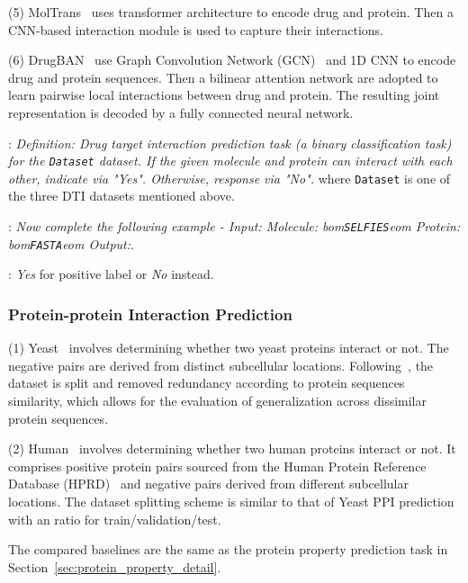 \documentclass[11pt]{article}
\newcommand{\bom}{bom}
\newcommand{\eom}{eom}
\newcommand{\bop}{bom}
\newcommand{\eop}{eom}
\newcommand{\dataset}{\texttt{Dataset}}
\newcommand{\selfies}{\texttt{SELFIES}}
\newcommand{\fasta}{\texttt{FASTA}}
\begin{document}
\noindent(5) MolTrans~\citep{Huang2021MolTransMI} uses transformer architecture to encode drug and protein. Then a CNN-based interaction module is used to capture their interactions.

\noindent(6) DrugBAN~\citep{bai2023interpretable} use Graph Convolution Network (GCN)~\citep{DBLP:conf/iclr/KipfW17} and 1D CNN to encode drug and protein sequences. Then a bilinear attention network are adopted to learn pairwise local interactions between drug and protein. The resulting joint representation is decoded by a fully connected neural network.


:
\textit{Definition: Drug target interaction prediction task (a binary classification task) for the \dataset{} dataset. If the given molecule and protein can interact with each other, indicate via "Yes". Otherwise, response via "No".} where \dataset{} is one of the three DTI datasets mentioned above.

:
\textit{Now complete the following example - Input: Molecule: \bom{}\selfies{}\eom{} Protein: \bop{}\fasta{}\eop{} Output:}.

:
\textit{Yes} for positive label or \textit{No} instead.

\subsubsection{Protein-protein Interaction Prediction}

\noindent(1) Yeast~\citep{guo2008using} involves determining whether two yeast proteins interact or not. The negative pairs are derived from distinct subcellular locations. Following~\citep{xu2022peer}, the dataset is split and removed redundancy according to protein sequences similarity, which allows for the evaluation of generalization across dissimilar protein sequences.

\noindent(2) Human~\citep{pan2010large} involves determining whether two human proteins interact or not. It comprises positive protein pairs sourced from the Human Protein Reference Database (HPRD)~\citep{peri2003development} and negative pairs derived from different subcellular locations. The dataset splitting scheme is similar to that of Yeast PPI prediction with an  ratio for train/validation/test. 

The compared baselines are the same as the protein property prediction task in Section~\ref{sec:protein_property_detail}.
\end{document}
